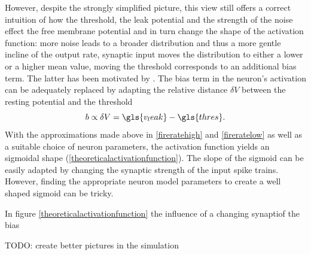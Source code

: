 However, despite the strongly simplified picture, this view still offers a correct intuition of how the threshold, the leak potential and the strength of the noise effect the free membrane potential and in turn change the shape of the activation function: more noise leads to a broader distribution and thus a more gentle incline of the output rate, synaptic input moves the distribution to either a lower or a higher mean value, moving the threshold corresponds to an additional bias term. The latter has been motivated by \citealp{petrovici2016stochastic}. The bias term in the neuron's activation can be adequately replaced by adapting the relative distance $\delta V$ between the resting potential and the threshold
\begin{equation}
b \propto \delta V = \gls{v_leak} - \gls{thres}.
\end{equation}
With the approximations made above in \cref{fireratehigh} and \cref{fireratelow} as well as a suitable choice of neuron parameters, the activation function yields an sigmoidal shape (\cref{theoreticalactivationfunction}). The slope of the sigmoid can be easily adapted by changing the synaptic strength of the input spike trains. However, finding the appropriate neuron model parameters to create a well shaped sigmoid can be tricky. 

In figure \cref{theoreticalactivationfunction} the influence of a changing synaptiof the bias

%

TODO: create better pictures in the simulation

